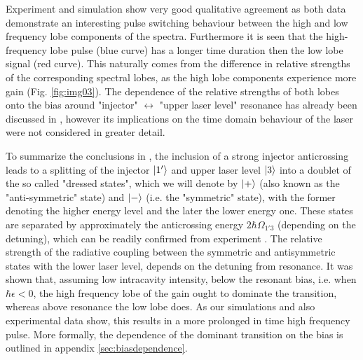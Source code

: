 \documentclass[twocolumn,secnumarabic,amssymb, nobibnotes, aps, prd]{revtex4-1}
\begin{document}
{			Experiment and simulation show very good qualitative agreement as both data demonstrate an interesting pulse switching behaviour between the high and low frequency lobe components of the spectra. Furthermore it is seen that the high-frequency lobe pulse (blue curve) has a longer time duration then the low lobe signal (red curve). This naturally comes from the difference in relative strengths of the corresponding spectral lobes, as the high lobe components experience more gain (Fig. \ref{fig:img03}). The dependence of the relative strengths of both lobes onto the bias around "injector" $\leftrightarrow$ "upper laser level" resonance has already been discussed in \cite{dupont2010simplified}, however its implications on the time domain behaviour of the laser were not considered in greater detail. 
			
			
			To summarize the conclusions in \cite{dupont2010simplified}, the inclusion of a strong injector anticrossing leads to a splitting of the injector $\Ket{1'}$ and upper laser level $\Ket{3}$ into a doublet of the so called "dressed states", which we will denote by $\Ket{+}$ (also known as the "anti-symmetric" state) and $\Ket{-}$ (i.e. the "symmetric" state), with the former denoting the higher energy level and the later the lower energy one. These states are separated by approximately the anticrossing energy $2\hbar\Omega_{1'3}$ (depending on the detuning), which can be readily confirmed from experiment \cite{burghoff2014terahertz}. The relative strength of the radiative coupling between the symmetric and antisymmetric states with the lower laser level, depends on the detuning from resonance. It was shown that, assuming low intracavity intensity, below the resonant bias, i.e. when $\hbar\epsilon <0$, the high frequency lobe of the gain ought to dominate the transition, whereas above resonance the low lobe does. As our simulations and also experimental data show, this results in a more prolonged in time high frequency pulse. More formally, the dependence of the dominant transition on the bias is outlined in appendix \ref{sec:biasdependence}. 
			
}
\end{document}
